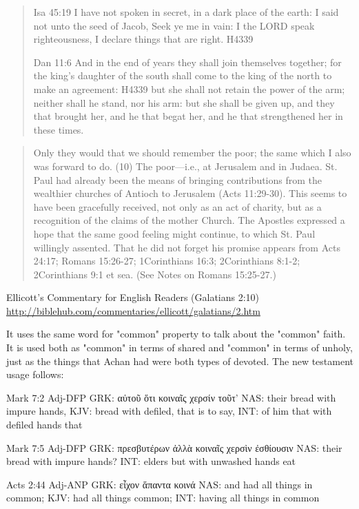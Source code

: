 \documentclass[11pt]{article}
\begin{document}
\begin{thebibliography}{37}
\begin{quote}
Isa 45:19
I have not spoken in secret, in a dark place of the earth: I said not unto the seed of Jacob, Seek ye me in vain: I the LORD speak righteousness, I declare things that are right. H4339

Dan 11:6
And in the end of years they shall join themselves together; for the king's daughter of the south shall come to the king of the north to make an agreement: H4339 but she shall not retain the power of the arm; neither shall he stand, nor his arm: but she shall be given up, and they that brought her, and he that begat her, and he that strengthened her in these times.
\end{quote}

\begin{quote}
Only they would that we should remember the poor; the same which I also was forward to do.
(10) The poor—i.e., at Jerusalem and in Judaea. St. Paul had already been the means of bringing contributions from the wealthier churches of Antioch to Jerusalem (Acts 11:29-30). This seems to have been gracefully received, not only as an act of charity, but as a recognition of the claims of the mother Church. The Apostles expressed a hope that the same good feeling might continue, to which St. Paul willingly assented. That he did not forget his promise appears from Acts 24:17; Romans 15:26-27; 1Corinthians 16:3; 2Corinthians 8:1-2; 2Corinthians 9:1 et sea. (See Notes on Romans 15:25-27.)
\end{quote}
Ellicott's Commentary for English Readers
(Galatians 2:10)
\url{http://biblehub.com/commentaries/ellicott/galatians/2.htm}

It uses the same word for "common" property to talk about the "common" faith. It is used both as "common" in terms of shared and "common" in terms of unholy, just as the things that Achan had were both types of devoted. The new testament usage follows:

\begin{greek}
Mark 7:2 Adj-DFP
GRK: αὐτοῦ ὅτι κοιναῖς χερσίν τοῦτ'
NAS: their bread with impure hands,
KJV: bread with defiled, that is to say,
INT: of him that with defiled hands that

Mark 7:5 Adj-DFP
GRK: πρεσβυτέρων ἀλλὰ κοιναῖς χερσὶν ἐσθίουσιν
NAS: their bread with impure hands?
INT: elders but with unwashed hands eat

Acts 2:44 Adj-ANP
GRK: εἶχον ἅπαντα κοινά 
NAS: and had all things in common;
KJV: had all things common;
INT: having all things in common


\end{greek}
\end{thebibliography}
\end{document}
